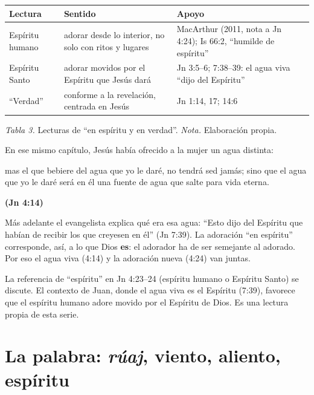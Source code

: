 \documentclass[11pt,letterpaper]{article}
\newcommand{\fuente}[1]{\par\hfill{\upshape\bfseries\small\textcolor{azul}{#1}}}
\newcommand{\destacar}[1]{\textbf{\textcolor{azul}{#1}}}
\begin{document}
\begin{center}\small\renewcommand{\arraystretch}{1.22}
\begin{tabular}{@{}L{3.0cm}L{5.6cm}L{5.6cm}@{}}
\toprule
\textbf{Lectura} & \textbf{Sentido} & \textbf{Apoyo} \\ \midrule
Espíritu humano & adorar desde lo interior, no solo con ritos y lugares & MacArthur (2011, nota a Jn 4:24); Is 66:2, ``humilde de espíritu'' \\
Espíritu Santo & adorar movidos por el Espíritu que Jesús dará & Jn 3:5--6; 7:38--39: el agua viva ``dijo del Espíritu'' \\
``Verdad'' & conforme a la revelación, centrada en Jesús & Jn 1:14, 17; 14:6 \\
\bottomrule
\end{tabular}\par
{\footnotesize\color{gris}\textit{Tabla 3.} Lecturas de ``en espíritu y en verdad''. \textit{Nota.} Elaboración propia.}
\end{center}

En ese mismo capítulo, Jesús había ofrecido a la mujer un agua distinta:

\begin{cita}mas el que bebiere del agua que yo le daré, no tendrá sed jamás; sino que el agua que yo le daré será en él una fuente de agua que salte para vida eterna.\fuente{(Jn 4:14)}\end{cita}

Más adelante el evangelista explica qué era esa agua: ``Esto dijo del Espíritu que habían de recibir los que creyesen en él'' (Jn 7:39). La adoración ``en espíritu'' corresponde, así, a lo que Dios \destacar{es}: el adorador ha de ser semejante al adorado. Por eso el agua viva (4:14) y la adoración nueva (4:24) van juntas.

\begin{nota}[Precisión]
La referencia de ``espíritu'' en Jn 4:23--24 (espíritu humano o Espíritu Santo) se discute. El contexto de Juan, donde el agua viva es el Espíritu (7:39), favorece que el espíritu humano adore movido por el Espíritu de Dios. Es una lectura propia de esta serie.
\end{nota}

\section{La palabra: \emph{rúaj}, viento, aliento, espíritu}
\end{document}
